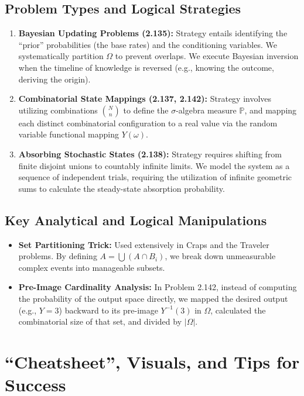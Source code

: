 \documentclass[11pt]{article}
\theoremstyle{definition}
\theoremstyle{plain}
\theoremstyle{remark}
\renewcommand{\P}{\mathbb{P}}
\newcommand{\1}{\mathbf{1}}
\begin{document}
\subsection{Problem Types and Logical Strategies}
\begin{enumerate}
    \item \textbf{Bayesian Updating Problems (2.135):} Strategy entails identifying the ``prior'' probabilities (the base rates) and the conditioning variables. We systematically partition $\Omega$ to prevent overlaps. We execute Bayesian inversion when the timeline of knowledge is reversed (e.g., knowing the outcome, deriving the origin).
    \item \textbf{Combinatorial State Mappings (2.137, 2.142):} Strategy involves utilizing combinations $\binom{N}{n}$ to define the $\sigma$-algebra measure $\P$, and mapping each distinct combinatorial configuration to a real value via the random variable functional mapping $Y(\omega)$.
    \item \textbf{Absorbing Stochastic States (2.138):} Strategy requires shifting from finite disjoint unions to countably infinite limits. We model the system as a sequence of independent trials, requiring the utilization of infinite geometric sums to calculate the steady-state absorption probability.
\end{enumerate}

\subsection{Key Analytical and Logical Manipulations}
\begin{itemize}
    \item \textbf{Set Partitioning Trick:} Used extensively in Craps and the Traveler problems. By defining $A = \bigcup (A \cap B_i)$, we break down unmeasurable complex events into manageable subsets.
    \item \textbf{Pre-Image Cardinality Analysis:} In Problem 2.142, instead of computing the probability of the output space directly, we mapped the desired output (e.g., $Y=3$) backward to its pre-image $Y^{-1}(3)$ in $\Omega$, calculated the combinatorial size of that set, and divided by $|\Omega|$.
\end{itemize}

\section{``Cheatsheet'', Visuals, and Tips for Success}
\end{document}
